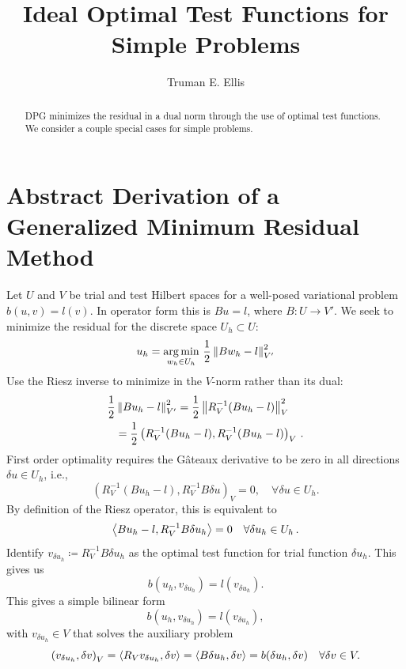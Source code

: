 \documentclass{article}
\title{Ideal Optimal Test Functions for Simple Problems}
\author{Truman E. Ellis}
\begin{document}
\maketitle
\begin{abstract}
DPG minimizes the residual in a dual norm through the use of optimal test functions. 
We consider a couple special cases for simple problems.
\end{abstract}

\section*{Abstract Derivation of a Generalized Minimum Residual Method}
Let $U$ and $V$ be trial and test Hilbert spaces for a well-posed variational
problem $b(u,v)=l(v)$. In operator form this is $Bu=l$, where $B:U\rightarrow
V'$. We seek to minimize the residual for the discrete space $U_h\subset U$:
\[
u_{h} = \underset{w_{h} \in U_{h}} {\operatorname*{arg\,min}} \,\, \frac{1}{2}
\left\| Bw_{h}-l \right\|_{V'}^{2}
\]
Use the Riesz inverse to minimize in the $V$-norm rather than its dual:
\begin{align*}
\frac{1}{2}&\left\| Bu_h-l \right\|^2_{V'}=\frac{1}{2}\left\| R_V^{-1}(Bu_h-l) \right\|^2_V\\
&=\frac{1}{2}\left( R_V^{-1}(Bu_h-l),R_V^{-1}(Bu_h-l) \right)_V\,.
\end{align*}
First order optimality requires
the G\^ateaux derivative to be zero in all directions $\delta u \in
U_h$, i.e.,
\[
\left(R_V^{-1}(Bu_h-l),R_V^{-1}B\delta u\right)_V = 0, \quad \forall \delta u \in U_h.
\]
By definition of the Riesz operator, this is equivalent to
\begin{equation*}
\left\langle Bu_h-l,R_V^{-1}B\delta u_h \right\rangle=0\quad\forall\delta u_h\in U_h\,.
\end{equation*}
Identify $v_{\delta u_h}\coloneqq R_V^{-1}B\delta u_h$ as the
optimal test function for trial function $\delta u_h$. This gives us
\begin{equation*}
b(u_h,v_{\delta u_h})=l(v_{\delta u_h}).
\end{equation*}
This gives a simple bilinear form
\begin{equation*}
b(u_h,v_{\delta u_h})=l(v_{\delta u_h}),
\end{equation*}
with $v_{\delta u_h}\in V$ that solves the auxiliary problem
\begin{equation*}
\left( v_{\delta u_h},\delta v \right)_V=\left\langle R_Vv_{\delta u_h},\delta v \right\rangle
=\left\langle B\delta u_h,\delta v \right\rangle=b(\delta u_h,\delta v)\quad\forall\delta v\in V.
\end{equation*}
\end{document}
